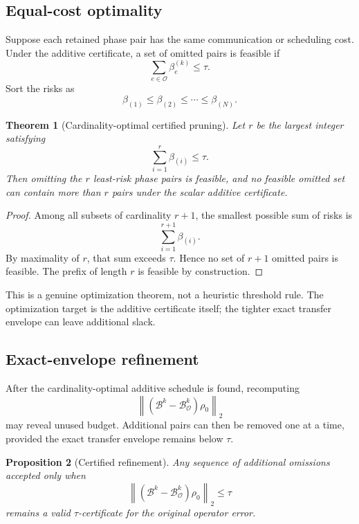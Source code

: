 \documentclass[11pt]{article}
\newtheorem{theorem}{Theorem}[section]
\newtheorem{proposition}[theorem]{Proposition}
\theoremstyle{definition}
\theoremstyle{remark}
\begin{document}
\subsection{Equal-cost optimality}

Suppose each retained phase pair has the same communication or scheduling
cost.  Under the additive certificate, a set of omitted pairs is feasible if
\[
\sum_{e\in\mathcal O}\beta_e^{(k)}\le\tau.
\]
Sort the risks as
\[
\beta_{(1)}\le\beta_{(2)}\le\cdots\le\beta_{(N)}.
\]

\begin{theorem}[Cardinality-optimal certified pruning]
\label{thm:unit-cost-optimal}
Let $r$ be the largest integer satisfying
\[
\sum_{i=1}^{r}\beta_{(i)}\le\tau.
\]
Then omitting the $r$ least-risk phase pairs is feasible, and no feasible
omitted set can contain more than $r$ pairs under the scalar additive
certificate.
\end{theorem}

\begin{proof}
Among all subsets of cardinality $r+1$, the smallest possible sum of risks is
\[
\sum_{i=1}^{r+1}\beta_{(i)}.
\]
By maximality of $r$, that sum exceeds $\tau$.  Hence no set of $r+1$ omitted
pairs is feasible.  The prefix of length $r$ is feasible by construction.
\end{proof}

This is a genuine optimization theorem, not a heuristic threshold rule.  The
optimization target is the additive certificate itself; the tighter exact
transfer envelope can leave additional slack.

\subsection{Exact-envelope refinement}

After the cardinality-optimal additive schedule is found, recomputing
\[
\left\lVert
(\mathcal B^k-\mathcal B_{\mathcal O}^k)\rho_0
\right\rVert_2
\]
may reveal unused budget.  Additional pairs can then be removed one at a time,
provided the exact transfer envelope remains below $\tau$.

\begin{proposition}[Certified refinement]\label{claim:final-16-5}
Any sequence of additional omissions accepted only when
\[
\left\lVert
(\mathcal B^k-\mathcal B_{\mathcal O}^k)\rho_0
\right\rVert_2\le\tau
\]
remains a valid $\tau$-certificate for the original operator error.
\end{proposition}
\end{document}
